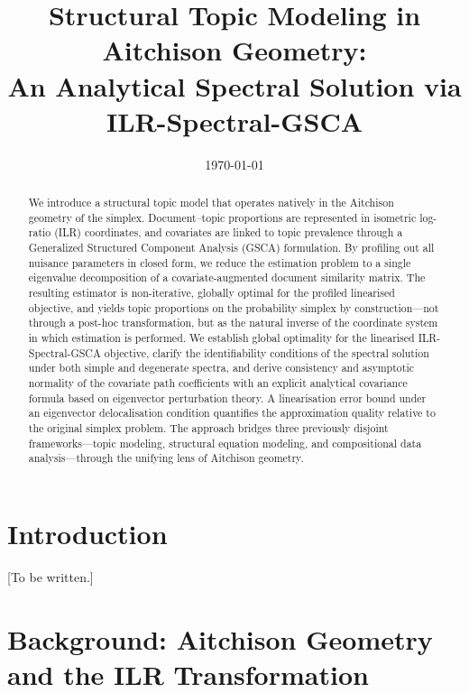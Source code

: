 \documentclass{article}
\begin{document}
\title{Structural Topic Modeling in Aitchison Geometry:\\
  An Analytical Spectral Solution via ILR-Spectral-GSCA}
\date{\today}
\maketitle

\begin{abstract}
We introduce a structural topic model that operates natively in the
Aitchison geometry of the simplex. Document--topic proportions are
represented in isometric log-ratio (ILR) coordinates, and covariates are
linked to topic prevalence through a Generalized Structured Component
Analysis (GSCA) formulation. By profiling out all nuisance parameters in
closed form, we reduce the estimation problem to a single eigenvalue
decomposition of a covariate-augmented document similarity matrix.
The resulting estimator is non-iterative, globally optimal for the
profiled linearised objective, and yields topic proportions on the
probability simplex by construction---not through a post-hoc
transformation, but as the natural inverse of the coordinate system in
which estimation is performed. We establish global optimality for the
linearised ILR-Spectral-GSCA objective, clarify the identifiability conditions
of the spectral solution under both simple and degenerate spectra, and
derive consistency and asymptotic normality of the covariate path
coefficients with an explicit analytical covariance formula based on
eigenvector perturbation theory. A linearisation error bound under an
eigenvector delocalisation condition quantifies the approximation quality
relative to the original simplex problem. The approach bridges three
previously disjoint frameworks---topic modeling, structural equation
modeling, and compositional data analysis---through the unifying lens of
Aitchison geometry.
\end{abstract}

\section{Introduction}
\label{sec:introduction}

[To be written.]

\section{Background: Aitchison Geometry and the ILR Transformation}
\label{sec:background}
\end{document}
